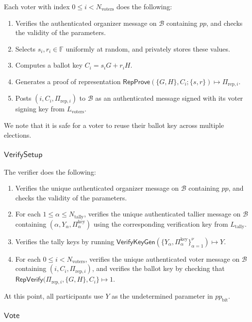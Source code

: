 \documentclass{article}
\newcommand{\F}{\mathbb{F}}
\newcommand{\func}[1]{\mathsf{#1}}
\begin{document}
Each voter with index $0 \leq i < N_{\text{voters}}$ does the following:
\begin{enumerate}
    \item Verifies the authenticated organizer message on $\mathcal{B}$ containing $pp$, and checks the validity of the parameters.
    \item Selects $s_i, r_i \in \F$ uniformly at random, and privately stores these values.
    \item Computes a ballot key $C_i = s_i G + r_i H$.
    \item Generates a proof of representation $\func{RepProve}(\{G, H\}, C_i ; \{s, r\}) \mapsto \Pi_{\text{rep},i}$.
    \item Posts $(i, C_i, \Pi_{\text{rep},i})$ to $\mathcal{B}$ as an authenticated message signed with its voter signing key from $L_{\text{voters}}$.
\end{enumerate}
We note that it is safe for a voter to reuse their ballot key across multiple elections.


\subsubsection{\texorpdfstring{$\func{VerifySetup}$}{VerifySetup}}

The verifier does the following:
\begin{enumerate}
    \item Verifies the unique authenticated organizer message on $\mathcal{B}$ containing $pp$, and checks the validity of the parameters.
    \item For each $1 \leq \alpha \leq N_{\text{tally}}$, verifies the unique authenticated tallier message on $\mathcal{B}$ containing $(\alpha, Y_\alpha, \Pi_\alpha^{\text{key}})$ using the corresponding verification key from $L_{\text{tally}}$.
    \item Verifies the tally keys by running $\func{VerifyKeyGen}(\{Y_\alpha, \Pi_\alpha^{\text{key}}\}_{\alpha=1}^{\nu}) \mapsto Y$.
    \item For each $0 \leq i < N_{\text{voters}}$, verifies the unique authenticated voter message on $\mathcal{B}$ containing $(i, C_i, \Pi_{\text{rep},i})$, and verifies the ballot key by checking that $\func{RepVerify}(\Pi_{\text{rep},i}, \{G, H\}, C_i\} \mapsto 1$.
\end{enumerate}
At this point, all participants use $Y$ as the undetermined parameter in $pp_{\text{bit}}$.


\subsubsection{\texorpdfstring{$\func{Vote}$}{Vote}}
\end{document}
